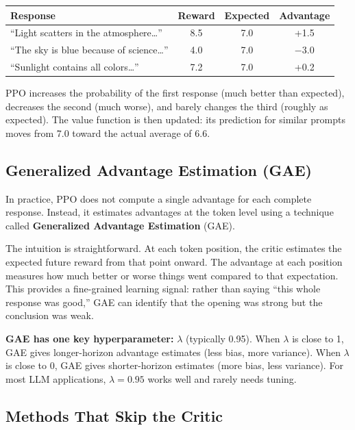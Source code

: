 \begin{chapterenv}
\begin{infobox}
\begin{center}
\begin{tabular}{p{}ccc}
\toprule
\textbf{Response} & \textbf{Reward} & \textbf{Expected} & \textbf{Advantage} \\
\midrule
``Light scatters in the atmosphere\ldots'' & 8.5 & 7.0 & +1.5 \\
``The sky is blue because of science\ldots'' & 4.0 & 7.0 & $-3.0$ \\
``Sunlight contains all colors\ldots'' & 7.2 & 7.0 & +0.2 \\
\bottomrule
\end{tabular}
\end{center}

PPO increases the probability of the first response (much better than expected), decreases the second (much worse), and barely changes the third (roughly as expected). The value function is then updated: its prediction for similar prompts moves from 7.0 toward the actual average of 6.6.
\end{infobox}

\subsection{Generalized Advantage Estimation (GAE)}

In practice, PPO does not compute a single advantage for each complete response. Instead, it estimates advantages at the token level using a technique called \textbf{Generalized Advantage Estimation} (GAE).

The intuition is straightforward. At each token position, the critic estimates the expected future reward from that point onward. The advantage at each position measures how much better or worse things went compared to that expectation. This provides a fine-grained learning signal: rather than saying ``this whole response was good,'' GAE can identify that the opening was strong but the conclusion was weak.

\begin{tipbox}
\textbf{GAE has one key hyperparameter:} $\lambda$ (typically 0.95). When $\lambda$ is close to 1, GAE gives longer-horizon advantage estimates (less bias, more variance). When $\lambda$ is close to 0, GAE gives shorter-horizon estimates (more bias, less variance). For most LLM applications, $\lambda = 0.95$ works well and rarely needs tuning.
\end{tipbox}

\subsection{Methods That Skip the Critic}


\end{chapterenv}
